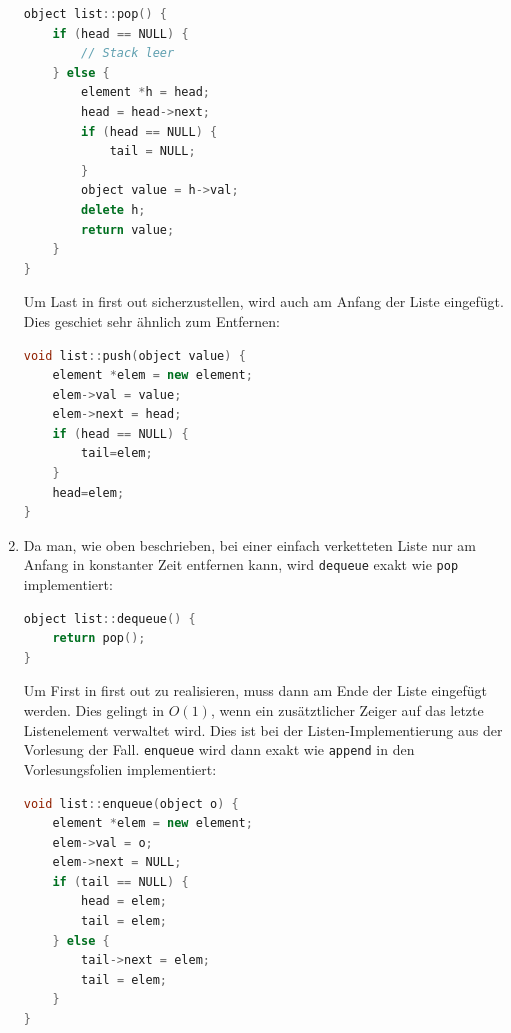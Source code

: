 \documentclass[11pt,a4paper]{article}
\begin{document}
\begin{loesung}
\begin{enumerate}
\begin{lstlisting}[language=c++]
object list::pop() {
    if (head == NULL) {
        // Stack leer
    } else {
        element *h = head;
        head = head->next;
        if (head == NULL) {
            tail = NULL;
        }
        object value = h->val;
        delete h;
        return value;
    }
}
        \end{lstlisting}
        Um \glqq{}Last in first out\grqq{} sicherzustellen, wird auch am Anfang der Liste eingefügt.
        Dies geschiet sehr ähnlich zum Entfernen:
        \begin{lstlisting}[language=c++]
void list::push(object value) {
    element *elem = new element;
    elem->val = value;
    elem->next = head;
    if (head == NULL) {
        tail=elem;
    }
    head=elem;
}
        \end{lstlisting}

        \item
        Da man, wie oben beschrieben, bei einer einfach verketteten Liste nur am Anfang in konstanter Zeit entfernen kann, wird \texttt{dequeue} exakt wie \texttt{pop} implementiert:
        \begin{lstlisting}[language=c++]
object list::dequeue() {
    return pop();
}
        \end{lstlisting}

        Um \glqq{}First in first out\grqq{} zu realisieren, muss dann am Ende der Liste eingefügt werden.
        Dies gelingt in $O(1)$, wenn ein zusätztlicher Zeiger auf das letzte Listenelement verwaltet wird.
        Dies ist bei der Listen-Implementierung aus der Vorlesung der Fall.
        \texttt{enqueue} wird dann exakt wie \texttt{append} in den Vorlesungsfolien implementiert:
        \begin{lstlisting}[language=c++]
void list::enqueue(object o) {
    element *elem = new element;
    elem->val = o;
    elem->next = NULL;
    if (tail == NULL) {
        head = elem;
        tail = elem;
    } else {
        tail->next = elem;
        tail = elem;
    }
}
        \end{lstlisting}
    \end{enumerate}
\end{loesung}
\end{document}
